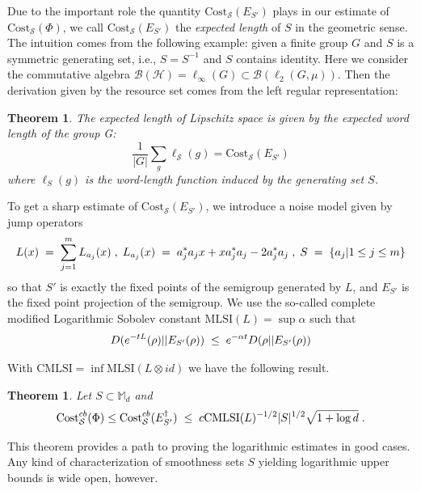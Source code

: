 \documentclass[11pt,reqno]{amsart}
\numberwithin{equation}{section}
\newtheorem{theorem}[lemma]{Theorem}
\newcommand{\mc}{\mathcal}
\newcommand{\Mz}{{\mathbb M}}
\newcommand{\Cost}{\mathrm{Cost}}
\newcommand{\pl}{\hspace{.1cm}}
\newcommand{\kl}{\pl \le \pl}
\newcommand{\lel}{\pl = \pl}
\begin{document}
Due to the important role the quantity $\Cost_{\mc S}(E_{S'})$ plays in our estimate of $\Cost_{\mc S}(\Phi)$, we call $\Cost_{\mc S}(E_{S'})$ the \textit{expected length} of $S$ in the geometric sense. The intuition comes from the following example:  
given a finite group $G$ and $S$ is a symmetric generating set, i.e., $S = S^{-1}$ and $S$ contains identity. Here we consider the commutative algebra $\mc B(\mc H) = \ell_{\infty}(G) \subset \mc B(\ell_2(G,\mu))$. Then the derivation given by the resource set comes from the left regular representation:

\begin{theorem}
	The expected length of Lipschitz space is given by the expected word length of the group G:
		\begin{equation}
			\frac{1}{|G|}\sum_g \ell_\mathcal{S}(g) = \Cost_{\mc S}(E_{S'})
	\end{equation}
		where $\ell_S(g)$ is the word-length function induced by the generating set $S$. 
	\end{theorem}

To get a sharp estimate of $\Cost_{\mc S}(E_{S'})$, we introduce a noise model given by jump operators 
  \[ L(x) \lel \sum_{j=1}^m  L_{a_j}(x)\pl , \pl 
   L_{a_j}(x) \lel a_j^*a_jx+xa_j^*a_j-2a_j^*a_j  \pl ,\pl 
   S \lel \{a_j|1\le j\le m\} \]
so that $S'$ is exactly the fixed points of the semigroup generated by $L$, and $E_{S'}$ is the fixed point projection of the semigroup. We use the so-called complete modified Logarithmic Sobolev constant $\text{MLSI}(L)=\sup\alpha$ such that 
\begin{equation}
    D(e^{-tL}(\rho)|| E_{S'}(\rho))
 \kl e^{-\alpha t} D(\rho ||E_{S'}(\rho)) 
\end{equation} 

With $\text{CMLSI}=\inf \text{MLSI}(L\otimes  id)$ we have  the following result. 

\begin{theorem} \label{cmlsi} Let $S\subset \Mz_d$ and 
 \[ \Cost_{\mc S}^{cb}(\Phi)\le \Cost_{\mc S}^{cb}(E_{S'}^{\dag})
 \kl c \text{CMLSI}(L)^{-1/2} |S|^{1/2} \sqrt{1+\log d} \pl .\] 
\end{theorem} 
  
This theorem provides a path to proving the logarithmic estimates in good cases. Any kind of characterization of smoothness sets $S$ yielding logarithmic upper bounds is wide open, however. 
\end{document}
